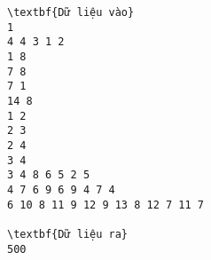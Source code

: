 \begin{verbatim}
\textbf{Dữ liệu vào}
1
4 4 3 1 2
1 8
7 8
7 1
14 8
1 2
2 3
2 4
3 4
3 4 8 6 5 2 5
4 7 6 9 6 9 4 7 4
6 10 8 11 9 12 9 13 8 12 7 11 7	

\textbf{Dữ liệu ra}
500
\end{verbatim}